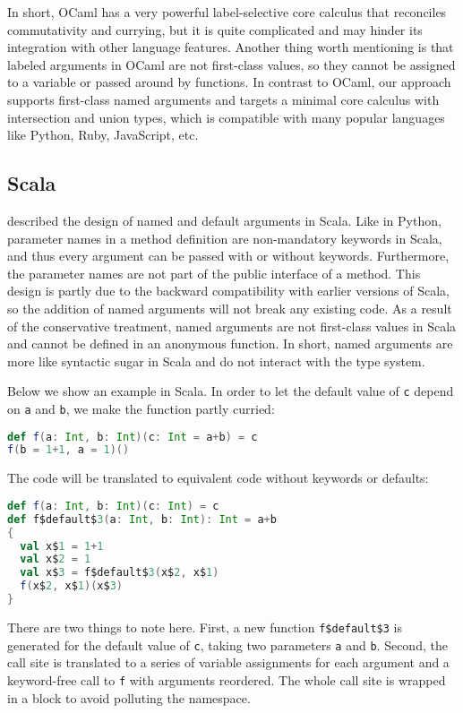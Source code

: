 In short, OCaml has a very powerful label-selective core calculus that
reconciles commutativity and currying, but it is quite complicated and may
hinder its integration with other language features. Another thing worth
mentioning is that labeled arguments in OCaml are not first-class values, so
they cannot be assigned to a variable or passed around by functions. In contrast
to OCaml, our approach supports first-class named arguments and targets a
minimal core calculus with intersection and union types, which is compatible
with many popular languages like Python, Ruby, JavaScript, etc.

\subsection{Scala}

\citet{rytz2010named} described the design of named and default arguments in
Scala. Like in Python, parameter names in a method definition are non-mandatory
keywords in Scala, and thus every argument can be passed with or without
keywords. Furthermore, the parameter names are not part of the public interface
of a method. This design is partly due to the backward compatibility with
earlier versions of Scala, so the addition of named arguments will not break any
existing code. As a result of the conservative treatment, named arguments are
not first-class values in Scala and cannot be defined in an anonymous function.
In short, named arguments are more like syntactic sugar in Scala and do not
interact with the type system.

Below we show an example in Scala. In order to let the default value of
\lstinline{c} depend on \lstinline{a} and \lstinline{b}, we make the function
partly curried:
\begin{lstlisting}[language=Scala]
def f(a: Int, b: Int)(c: Int = a+b) = c
f(b = 1+1, a = 1)()
\end{lstlisting}
The code will be translated to equivalent code without keywords or defaults:
\begin{lstlisting}[language=Scala]
def f(a: Int, b: Int)(c: Int) = c
def f$default$3(a: Int, b: Int): Int = a+b
{
  val x$1 = 1+1
  val x$2 = 1
  val x$3 = f$default$3(x$2, x$1)
  f(x$2, x$1)(x$3)
}
\end{lstlisting}
There are two things to note here. First, a new function \lstinline{f$default$3}
is generated for the default value of \lstinline{c}, taking two parameters
\lstinline{a} and \lstinline{b}. Second, the call site is translated to a series
of variable assignments for each argument and a keyword-free call to
\lstinline{f} with arguments reordered. The whole call site is wrapped in a
block to avoid polluting the namespace.

